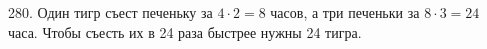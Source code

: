 280. Один тигр съест печеньку за $4\cdot2=8$ часов, а три печеньки за $8\cdot3=24$ часа. Чтобы съесть их в 24 раза быстрее нужны 24 тигра.\\

